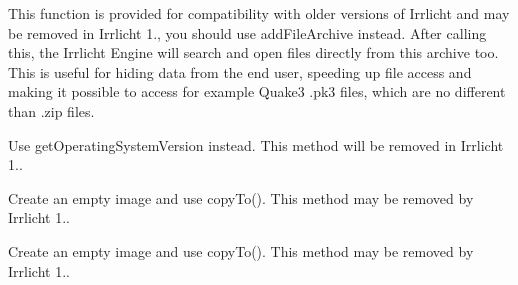 \begin{DoxyRefList}
\item[\label{deprecated__deprecated000001}%
\hypertarget{deprecated__deprecated000001}{}%
Member \hyperlink{classirr_1_1io_1_1IFileSystem_aef11ff9b5c171d7b3a99d8a79b71f2b3}{irr\+:\+:io\+:\+:I\+File\+System\+:\+:add\+Zip\+File\+Archive} (const c8 $\ast$filename, bool ignore\+Case=true, bool ignore\+Paths=true)]This function is provided for compatibility with older versions of Irrlicht and may be removed in Irrlicht 1., you should use add\+File\+Archive instead. After calling this, the Irrlicht Engine will search and open files directly from this archive too. This is useful for hiding data from the end user, speeding up file access and making it possible to access for example Quake3 .pk3 files, which are no different than .zip files.  
\item[\label{deprecated__deprecated000004}%
\hypertarget{deprecated__deprecated000004}{}%
Member \hyperlink{classirr_1_1IOSOperator_a213ace1e7332bf2b08e5c8245784cb0e}{irr\+:\+:I\+O\+S\+Operator\+:\+:get\+Operation\+System\+Version} () const ]Use get\+Operating\+System\+Version instead. This method will be removed in Irrlicht 1..  
\item[\label{deprecated__deprecated000007}%
\hypertarget{deprecated__deprecated000007}{}%
Member \hyperlink{classirr_1_1video_1_1IVideoDriver_aa06059abf33e473d7af77e1fbc2b0f75}{irr\+:\+:video\+:\+:I\+Video\+Driver\+:\+:create\+Image} (\hyperlink{classirr_1_1video_1_1IImage}{I\+Image} $\ast$image\+To\+Copy, const core\+::position2d$<$ s32 $>$ \&pos, const core\+::dimension2d$<$ u32 $>$ \&size)=0]Create an empty image and use copy\+To(). This method may be removed by Irrlicht 1..  
\item[\label{deprecated__deprecated000006}%
\hypertarget{deprecated__deprecated000006}{}%
Member \hyperlink{classirr_1_1video_1_1IVideoDriver_af92ef735bc8c755f5c201a52a70d05e8}{irr\+:\+:video\+:\+:I\+Video\+Driver\+:\+:create\+Image} (E\+C\+O\+L\+O\+R\+\_\+\+F\+O\+R\+M\+AT format, \hyperlink{classirr_1_1video_1_1IImage}{I\+Image} $\ast$image\+To\+Copy)=0]Create an empty image and use copy\+To(). This method may be removed by Irrlicht 1.. 
\end{DoxyRefList}